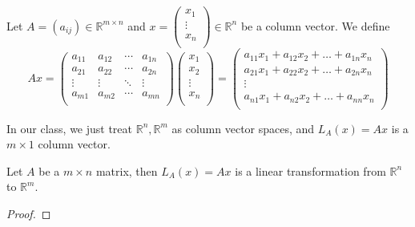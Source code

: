 \begin{definition}
    Let \(A = (a_{ij}) \in \mathbb{R} ^{m \times n}\) and \(x = \begin{pmatrix}
         x_1 \\
         \vdots \\
         x_n \\
    \end{pmatrix} \in \mathbb{R} ^n\) be a column vector. We define 
    \[
        Ax = \begin{pmatrix}
            a_{11} & a_{12} & \cdots & a_{1n}  \\
            a_{21} & a_{22} & \cdots & a_{2n}  \\
            \vdots & \vdots & \ddots &  \vdots \\
            a_{m1} & a_{m2}  & \cdots & a_{mn}  \\
        \end{pmatrix} \begin{pmatrix}
             x_1 \\
             x_2 \\
             \vdots \\
             x_n \\
        \end{pmatrix} = \begin{pmatrix}
             a_{11} x_1 + a_{12} x_2 + \dots + a_{1n} x_n \\
             a_{21} x_1 + a_{22} x_2 + \dots + a_{2n} x_n \\
             \vdots \\
             a_{n1} x_1 + a_{n2} x_2 + \dots + a_{nn} x_n \\
        \end{pmatrix}
    \]
\end{definition}

\begin{remark}
    In our class, we just treat \(\mathbb{R} ^n, \mathbb{R} ^m\) as column vector spaces, and \(L_A(x) = Ax\) is a \(m \times 1\) column vector.  
\end{remark}

\begin{theorem}
    Let \(A\) be a \(m \times n\) matrix, then \(L_A(x) = A x\) is a linear transformation from \(\mathbb{R} ^n\) to \(\mathbb{R} ^m\).     
\end{theorem}
\begin{proof}
\end{proof}


